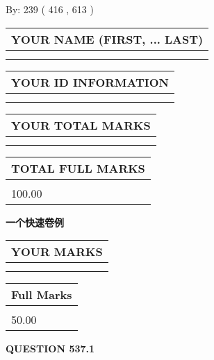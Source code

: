 \documentclass{ctexart}
\begin{document}
   
\hspace{1.0in} By: 
 239 ( 416 ,  613 )
   
   
   
   
\newpage 
\setcounter{page}{ 
   537001 } 
   
   
   
   
\noindent\begin{tabular}{|l|}
\hline
YOUR NAME (FIRST, ... LAST)  \\
\hline
 \\ 
 \\ 
\hline
\end{tabular}
\hspace{0.05in} \begin{tabular}{|l|}
\hline
 YOUR   ID   INFORMATION  \\
\hline
 \\ 
 \\ 
\hline
\end{tabular}
   
   
\vspace{0.2in}\noindent\begin{tabular}{|l|}
\hline
YOUR TOTAL MARKS  \\
\hline
 \\ 
 \\ 
\hline
\end{tabular}
\hspace{0.05in} \begin{tabular}{|l|}
\hline
TOTAL FULL MARKS  \\
\hline
 \\ 
100.00 \\
\hline
\end{tabular}
   
   
 \vspace{0.2in}
{\LARGE {\textbf{ 一个快速卷例}}}
   
   
  
\vspace{0.2in}
  
\noindent\begin{tabular}{|l|}
\hline
 YOUR MARKS  \\
\hline
 \\ 
 \\ 
\hline
\end{tabular}
\hspace{0.05in} \begin{tabular}{|l|}
\hline
 Full Marks  \\
\hline
 \\ 
50.00 \\
\hline
\end{tabular}
{\textbf{\Large{QUESTION
537.1 
}}}
  
\end{document}
